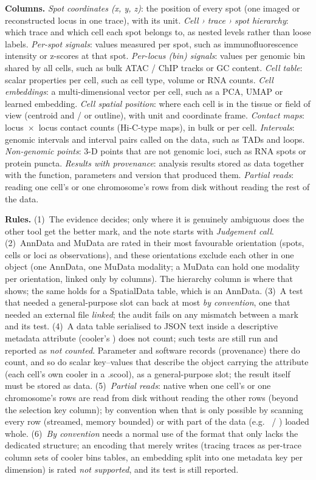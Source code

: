 \normalsize
\noindent\textbf{Columns.}
\emph{Spot coordinates (x, y, z)}: the position of every spot (one imaged or reconstructed locus in one trace), with its unit.
\emph{Cell › trace › spot hierarchy}: which trace and which cell each spot belongs to, as nested levels rather than loose labels.
\emph{Per-spot signals}: values measured per spot, such as immunofluorescence intensity or z-scores at that spot.
\emph{Per-locus (bin) signals}: values per genomic bin shared by all cells, such as bulk ATAC / ChIP tracks or GC content.
\emph{Cell table}: scalar properties per cell, such as cell type, volume or RNA counts.
\emph{Cell embeddings}: a multi-dimensional vector per cell, such as a PCA, UMAP or learned embedding.
\emph{Cell spatial position}: where each cell is in the tissue or field of view (centroid and / or outline), with unit and coordinate frame.
\emph{Contact maps}: locus~$\times$~locus contact counts (Hi-C-type maps), in bulk or per cell.
\emph{Intervals}: genomic intervals and interval pairs called on the data, such as TADs and loops.
\emph{Non-genomic points}: 3-D points that are not genomic loci, such as RNA spots or protein puncta.
\emph{Results with provenance}: analysis results stored as data together with the function, parameters and version that produced them.
\emph{Partial reads}: reading one cell's or one chromosome's rows from disk without reading the rest of the data.

\medskip\noindent\textbf{Rules.}
(1)~The evidence decides; only where it is genuinely ambiguous does the other tool get the better mark, and the note starts with \emph{Judgement call}.
(2)~AnnData and MuData are rated in their most favourable orientation (spots, cells or loci as observations), and these orientations exclude each other in one object (one AnnData, one MuData modality; a MuData can hold one modality per orientation, linked only by  columns). The hierarchy column is where that shows; the same holds for a SpatialData table, which is an AnnData.
(3)~A test that needed a general-purpose slot can back at most \emph{by convention}, one that needed an external file \emph{linked}; the audit fails on any mismatch between a mark and its test.
(4)~A data table serialised to JSON text inside a descriptive metadata attribute (cooler's ) does not count; such tests are still run and reported as \emph{not counted}. Parameter and software records (provenance) there do count, and so do scalar key--values that describe the object carrying the attribute (each cell's own cooler in a .scool), as a general-purpose slot; the result itself must be stored as data.
(5)~\emph{Partial reads}: native when one cell's or one chromosome's rows are read from disk without reading the other rows (beyond the selection key column); by convention when that is only possible by scanning every row (streamed, memory bounded) or with part of the data (e.g.\  / ) loaded whole.
(6)~\emph{By convention} needs a normal use of the format that only lacks the dedicated structure; an encoding that merely writes (tracing traces as per-trace column sets of cooler bins tables, an embedding split into one metadata key per dimension) is rated \emph{not supported}, and its test is still reported.

